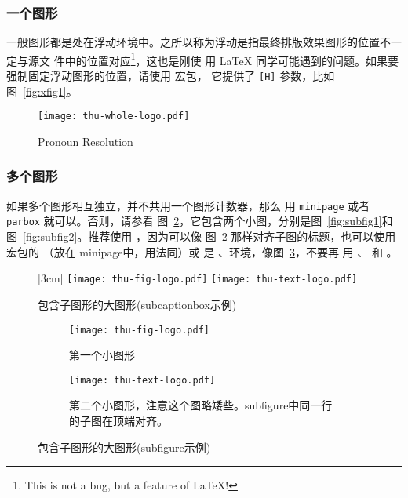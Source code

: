 \subsubsection{一个图形}
\label{sec:onefig}
一般图形都是处在浮动环境中。之所以称为浮动是指最终排版效果图形的位置不一定与源文
件中的位置对应\footnote{This is not a bug, but a feature of \LaTeX!}，这也是刚使
用 \LaTeX{} 同学可能遇到的问题。如果要强制固定浮动图形的位置，请使用  宏包，
它提供了 \texttt{[H]} 参数，比如图~\ref{fig:xfig1}。
\begin{figure}[H] %
  \centering
  \texttt{[image: thu-whole-logo.pdf]}
  \caption{Pronoun Resolution}
  \label{fig:PR}
\end{figure}



\subsubsection{多个图形}
\label{sec:multifig}

如果多个图形相互独立，并不共用一个图形计数器，那么
用 \texttt{minipage} 或者\texttt{parbox} 就可以。否则，请参看
图~\ref{fig:big1-subcaptionbox}，它包含两个小图，分别是图~\ref{fig:subfig1}和
图~\ref{fig:subfig2}。推荐使用 ，因为可以像
图~\ref{fig:big1-subcaptionbox} 那样对齐子图的标题，也可以使用 
宏包的 （放在 minipage中，用法同）或
是  、环境，像图~\ref{fig:big1-subfigure}，不要再
用 、 和 。

\begin{figure}[h]
  \centering%
  [3cm] %
    {\texttt{[image: thu-fig-logo.pdf]}}%
  \hspace{4em}%
      {\texttt{[image: thu-text-logo.pdf]}}
  \caption{包含子图形的大图形(subcaptionbox示例)}
  \label{fig:big1-subcaptionbox}
\end{figure}
\begin{figure}[h]
  \centering%
  \begin{subfigure}{3cm}
    \texttt{[image: thu-fig-logo.pdf]}
    \caption{第一个小图形}
  \end{subfigure}%
  \hspace{4em}%
  \begin{subfigure}{0.5\textwidth}
    \texttt{[image: thu-text-logo.pdf]}
    \caption{第二个小图形，注意这个图略矮些。subfigure中同一行的子图在顶端对齐。}
  \end{subfigure}
  \caption{包含子图形的大图形(subfigure示例)}
  \label{fig:big1-subfigure}
\end{figure}



